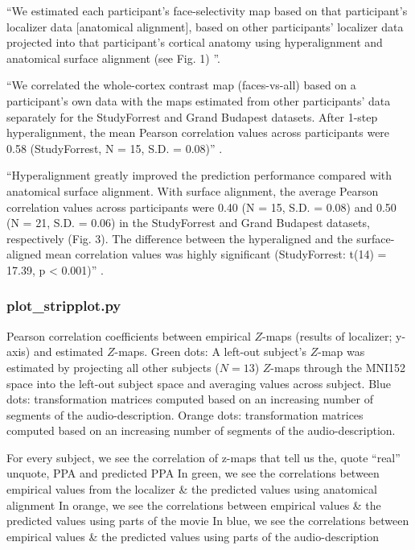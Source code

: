 
``We estimated each participant's face-selectivity map based on that
participant’s localizer data [anatomical alignment], based on other
participants' localizer data projected into that participant's cortical anatomy
using hyperalignment and anatomical surface alignment (see Fig. 1)
\citep{jiahui2020predicting}''.

``We correlated the whole-cortex contrast map (faces-vs-all) based on a
participant’s own data with the maps estimated from other participants’ data
separately for the StudyForrest and Grand Budapest datasets. After 1-step
hyperalignment, the mean Pearson correlation values across participants were
0.58 (StudyForrest, N = 15, S.D. = 0.08)'' \citep{jiahui2020predicting}.

``Hyperalignment greatly improved the prediction performance compared with
anatomical surface alignment. With surface alignment, the average Pearson
correlation values across participants were 0.40 (N = 15, S.D. = 0.08) and 0.50
(N = 21, S.D. = 0.06) in the StudyForrest and Grand Budapest datasets,
respectively (Fig. 3). The difference between the hyperaligned and the
surface-aligned mean correlation values was highly significant (StudyForrest:
t(14) = 17.39, p < 0.001)'' \citep{jiahui2020predicting}.


\subsubsection{plot\_stripplot.py}

%
Pearson correlation coefficients between empirical $Z$-maps (results of
localizer; y-axis) and estimated $Z$-maps.
%
Green dots: A left-out subject's $Z$-map was estimated by projecting all other
subjects ($N = 13$) $Z$-maps through the MNI152 space into the left-out subject
space and averaging values across subject.
%
Blue dots: transformation matrices computed based on an increasing number of
segments of the audio-description.
%
Orange dots: transformation matrices computed based on an increasing number of
segments of the audio-description.


For every subject, we see the correlation of z-maps that tell us the, quote
``real'' unquote, PPA and predicted PPA
%
In green, we see the correlations between empirical values from the localizer \&
the predicted values using anatomical alignment
%
In orange, we see the correlations between empirical values \& the predicted
values using parts of the movie
%
In blue, we see the correlations between empirical values \& the predicted
values using parts of the audio-description



